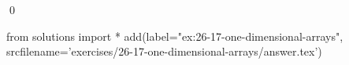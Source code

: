 
\begin{ex}
  \label{ex:26-17-one-dimensional-arrays}
  
  \qed
\end{ex}
\begin{python0}
from solutions import *
add(label="ex:26-17-one-dimensional-arrays",
    srcfilename='exercises/26-17-one-dimensional-arrays/answer.tex')
\end{python0}
